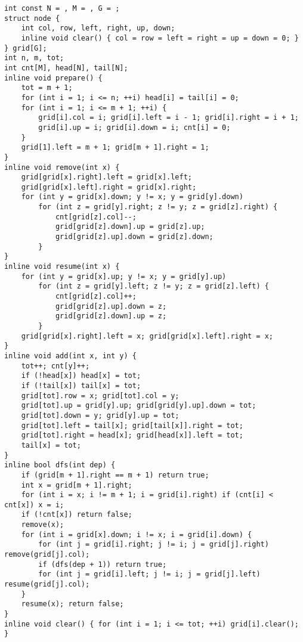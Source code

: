 \begin{lstlisting}
int const N = , M = , G = ;
struct node {
	int col, row, left, right, up, down;
	inline void clear() { col = row = left = right = up = down = 0; }
} grid[G];
int n, m, tot;
int cnt[M], head[N], tail[N];
inline void prepare() {
	tot = m + 1;
	for (int i = 1; i <= n; ++i) head[i] = tail[i] = 0;
	for (int i = 1; i <= m + 1; ++i) {
		grid[i].col = i; grid[i].left = i - 1; grid[i].right = i + 1;
		grid[i].up = i; grid[i].down = i; cnt[i] = 0;
	}
	grid[1].left = m + 1; grid[m + 1].right = 1;
}
inline void remove(int x) {
	grid[grid[x].right].left = grid[x].left;
	grid[grid[x].left].right = grid[x].right;
	for (int y = grid[x].down; y != x; y = grid[y].down)
		for (int z = grid[y].right; z != y; z = grid[z].right) {
			cnt[grid[z].col]--;
			grid[grid[z].down].up = grid[z].up;
			grid[grid[z].up].down = grid[z].down;
		}
}
inline void resume(int x) {
	for (int y = grid[x].up; y != x; y = grid[y].up)
		for (int z = grid[y].left; z != y; z = grid[z].left) {
			cnt[grid[z].col]++;
			grid[grid[z].up].down = z;
			grid[grid[z].down].up = z;
		}
	grid[grid[x].right].left = x; grid[grid[x].left].right = x;
}
inline void add(int x, int y) {
	tot++; cnt[y]++;
	if (!head[x]) head[x] = tot;
	if (!tail[x]) tail[x] = tot;
	grid[tot].row = x; grid[tot].col = y;
	grid[tot].up = grid[y].up; grid[grid[y].up].down = tot;
	grid[tot].down = y; grid[y].up = tot;
	grid[tot].left = tail[x]; grid[tail[x]].right = tot;
	grid[tot].right = head[x]; grid[head[x]].left = tot;
	tail[x] = tot;
}
inline bool dfs(int dep) {
	if (grid[m + 1].right == m + 1) return true;
	int x = grid[m + 1].right;
	for (int i = x; i != m + 1; i = grid[i].right) if (cnt[i] < cnt[x]) x = i;
	if (!cnt[x]) return false;
	remove(x);
	for (int i = grid[x].down; i != x; i = grid[i].down) {
		for (int j = grid[i].right; j != i; j = grid[j].right) remove(grid[j].col);
		if (dfs(dep + 1)) return true;
		for (int j = grid[i].left; j != i; j = grid[j].left) resume(grid[j].col);
	}
	resume(x); return false;
}
inline void clear() { for (int i = 1; i <= tot; ++i) grid[i].clear(); }
\end{lstlisting}

